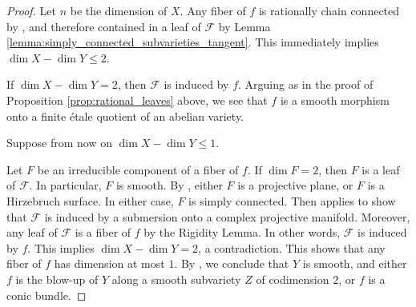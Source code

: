 \documentclass[english,10pt]{amsart}
\renewcommand{\le}{\leqslant}
\newcommand{\cF}{\mathcal{F}}
\theoremstyle{definition}
\theoremstyle{remark}
\numberwithin{equation}{section}
\begin{document}
\begin{proof}
Let $n$ be the dimension of $X$. Any fiber of $f$ is rationally chain connected by \cite[Corollary 1.4]{hacon_mckernan}, and therefore contained in a leaf of $\cF$ by Lemma \ref{lemma:simply_connected_subvarieties_tangent}. This immediately implies $\dim X - \dim Y \le 2$. 

\medskip

If $\dim X - \dim Y = 2$, then $\cF$ is induced by $f$. Arguing as in the proof of Proposition \ref{prop:rational_leaves} above, we see that $f$ is a smooth morphism onto a finite \'etale quotient of an abelian variety.

\medskip

Suppose from now on $\dim X - \dim Y \le 1$. 

\medskip

Let $F$ be an irreducible component of a fiber of $f$. If $\dim F = 2$, then $F$ is a leaf of $\cF$. In particular, $F$ is smooth. By \cite[Theorem 1.9]{andreatta_wisniewski_view}, either $F$ is a projective plane, or $F$ is a Hirzebruch surface. In either case, $F$ is simply connected. Then \cite[Corollary 2.11]{hoering_split} applies to show that $\cF$ is induced by a submersion onto a complex projective manifold. Moreover, any leaf of $\cF$ is a fiber of $f$ by the Rigidity Lemma. In other words, $\cF$ is induced by $f$. This implies $\dim X - \dim Y = 2$, a contradiction. This shows that any fiber of $f$ has dimension at most $1$. By \cite[Theorem 1.2]{wisn_crelle}, we conclude that $Y$ is smooth, and either $f$ is the blow-up of $Y$ along a smooth subvariety $Z$ of codimension $2$, or $f$ is a conic bundle. 

\medskip


\end{proof}
\end{document}
